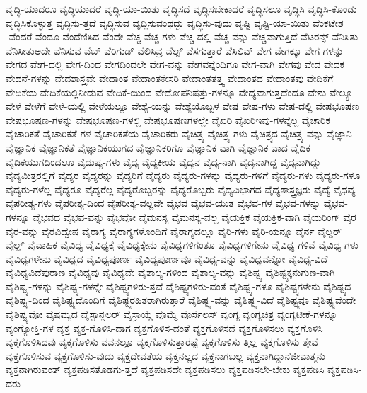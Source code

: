 {ವೃದ್ಧಿ-ಯಾದರೂ
ವೃದ್ಧಿಯಾದರೆ
ವೃದ್ಧಿ-ಯಾ-ಯಿತು
ವೃದ್ಧಿಸದೆ
ವೃದ್ಧಿಸಬೇಕಾದರೆ
ವೃದ್ಧಿಸಲೂ
ವೃದ್ಧಿಸಿ
ವೃದ್ಧಿಸಿ-ಕೊಂಡು
ವೃದ್ಧಿಸಿಕೊಳ್ಳುತ್ತ
ವೃದ್ಧಿಸು-ತ್ತದೆ
ವೃದ್ಧಿಸುವ
ವೃದ್ಧಿಸುವಂಥದ್ದು
ವೃದ್ಧಿಸು-ವುದು
ವೃಷ್ಟಿ
ವೃಷ್ಟಿ-ಯಾ-ಯಿತು
ವೆಂಕಟೇಶ
-ವೆಂದರೆ
ವೆಂದೂ
ವೆಂದೆಣಿಸಿದ
ವೆಂದೇ
ವೆಚ್ಚ
ವೆಚ್ಚ-ಗಳು
ವೆಚ್ಚ-ದಲ್ಲಿ
ವೆಚ್ಚ-ವನ್ನು
ವೆಚ್ಚವಾಗುತ್ತಿದೆ
ವೆಟರನ್ಸ್
ವೆನಿಸಿತು
ವೆನಿಸೀತುಅದೇ
ವೆನಿಸುವ
ವೆಬ್
ವೆರಿಗುಡ್
ವೆಲಿಸಿವ್ರ
ವೆಲ್ಸ್
ವೆಸಗುತ್ತಾರೆ
ವೆಸಿಲಿವ್
ವೇಗ
ವೇಗಕ್ಕೂ
ವೇಗ-ಗಳನ್ನು
ವೇಗದ
ವೇಗ-ದಲ್ಲಿ
ವೇಗ-ದಿಂದ
ವೇಗದಿಂದಲೇ
ವೇಗ-ವನ್ನು
ವೇಗವನ್ನೆಂದಿಗೂ
ವೇಗ-ವಾಗಿ
ವೇಗವು
ವೇದ
ವೇದಕ
ವೇದನೆ-ಗಳನ್ನು
ವೇದಶಾಸ್ತ್ರವೇ
ವೇದಾಂತ
ವೇದಾಂತಕೇಸರಿ
ವೇದಾಂತತತ್ತ್ವ
ವೇದಾಂತದ
ವೇದಾಂತವು
ವೇದಿಕೆಗೆ
ವೇದಿಕೆಯ
ವೇದಿಕೆಯಲ್ಲಿನೀಡುವ
ವೇದಿಕೆ-ಯಿಂದ
ವೇದೋಪನಿಷತ್ತು-ಗಳನ್ನೂ
ವೇದ್ಯವಾಗುತ್ತದೆಂದೂ
ವೇನು
ವೇಲ್ಯೂ
ವೇಳೆ
ವೇಳೆಗೆ
ವೇಳೆ-ಯಲ್ಲಿ
ವೇಳೆಯಲ್ಲೂ
ವೇಶ್ಯೆ-ಯನ್ನು
ವೇಶ್ಯೆಯೊಬ್ಬಳ
ವೇಷ
ವೇಷ-ಗಳು
ವೇಷ-ದಲ್ಲಿ
ವೇಷಭೂಷಣ
ವೇಷಭೂಷಣ-ಗಳನ್ನು
ವೇಷಭೂಷಣ-ಗಳಲ್ಲಿ
ವೇಷಭೂಷಣಗಳಲ್ಲೇ
ವೈಖರಿ
ವೈಖರಿಇವು-ಗಳನ್ನೆಲ್ಲ
ವೈಚಾರಿಕ
ವೈಚಾರಿಕತೆ
ವೈಚಾರಿಕತೆ-ಗಳ
ವೈಚಾರಿಕತೆಯ
ವೈಚಾರಿಕರು
ವೈಚಿತ್ರ್ಯ
ವೈಚಿತ್ರ್ಯ-ಗಳು
ವೈಚಿತ್ರ್ಯದ
ವೈಚಿತ್ರ್ಯ-ವನ್ನು
ವೈಜ್ಞಾನಿ
ವೈಜ್ಞಾನಿಕ
ವೈಜ್ಞಾನಿಕತೆ
ವೈಜ್ಞಾನಿಕಯುಗದ
ವೈಜ್ಞಾನಿಕರಿಗೂ
ವೈಜ್ಞಾನಿಕ-ವಾಗಿ
ವೈಜ್ಞಾನಿಕ-ವಾದ
ವೈದಿಕ
ವೈದಿಕಯುಗದಿಂದಲೂ
ವೈದುಷ್ಯ-ಗಳು
ವೈದ್ಯ
ವೈದ್ಯಕೀಯ
ವೈದ್ಯನ
ವೈದ್ಯ-ನಾಗಿ
ವೈದ್ಯನಾಗಿದ್ದ
ವೈದ್ಯನಾಗಿದ್ದು
ವೈದ್ಯಮಿತ್ರರಲ್ಲಿಗೆ
ವೈದ್ಯರ
ವೈದ್ಯರನ್ನು
ವೈದ್ಯರಿಗೆ
ವೈದ್ಯರು
ವೈದ್ಯರು-ಗಳನ್ನು
ವೈದ್ಯರು-ಗಳಿಗೆ
ವೈದ್ಯರು-ಗಳು
ವೈದ್ಯರು-ಗಳೂ
ವೈದ್ಯರು-ಗಳೆಲ್ಲ
ವೈದ್ಯರೂ
ವೈದ್ಯರೆಲ್ಲ
ವೈದ್ಯರೊಬ್ಬರನ್ನು
ವೈದ್ಯರೊಬ್ಬರು
ವೈದ್ಯವಿಭಾಗದ
ವೈದ್ಯಶಾಸ್ತ್ರಜ್ಞರು
ವೈದ್ಯೆ
ವೈಧವ್ಯ
ವೈಪರೀತ್ಯ-ಗಳು
ವೈಪರೀತ್ಯ-ದಿಂದ
ವೈಪರೀತ್ಯ-ವಲ್ಲವೇ
ವೈಭವ
ವೈಭವ-ಯುತ
ವೈಭವ-ಗಳ
ವೈಭವ-ಗಳನ್ನು
ವೈಭವ-ಗಳನ್ನೂ
ವೈಭವದ
ವೈಭವ-ವನ್ನು
ವೈಭವೋ
ವೈಮನಸ್ಯ
ವೈಮನಸ್ಯ-ವಲ್ಲ
ವೈಯಕ್ತಿಕ
ವೈಯಕ್ತಿಕ-ವಾಗಿ
ವೈಯರಿಂಗ್
ವೈರ
ವೈರ-ವನ್ನು
ವೈರವಿದ್ವೇಷ
ವೈರಾಗ್ಯ
ವೈರಾಗ್ಯಗಳೊಂದಿಗೆ
ವೈರಾಗ್ಯದಲ್ಲೂ
ವೈರಿ-ಗಳು
ವೈರಿ-ಯನ್ನೂ
ವೈರ್ನ
ವೈಲ್ಡರ್
ವೈಲ್ಡ್
ವೈವಾಹಿಕ
ವೈವಿಧ್ಯ
ವೈವಿಧ್ಯಕ್ಕೆ
ವೈವಿಧ್ಯಕ್ಕೇನು
ವೈವಿಧ್ಯಗಳಿಗಂತೂ
ವೈವಿಧ್ಯಗಳಿಗೇನು
ವೈವಿಧ್ಯ-ಗಳಿವೆ
ವೈವಿಧ್ಯ-ಗಳು
ವೈವಿಧ್ಯಗಳೇನು
ವೈವಿಧ್ಯದ
ವೈವಿಧ್ಯಪೂರ್ಣ
ವೈವಿಧ್ಯಪೂರ್ಣವೂ
ವೈವಿಧ್ಯ-ವನ್ನು
ವೈವಿಧ್ಯವನ್ನೋ
ವೈವಿಧ್ಯ-ವಿದೆ
ವೈವಿಧ್ಯವಿದೆಪುರಾಣ
ವೈವಿಧ್ಯವು
ವೈವಿಧ್ಯವೇ
ವೈಶಾಲ್ಯ-ಗಳಿಂದ
ವೈಶಾಲ್ಯ-ವನ್ನು
ವೈಶಿಷ್ಟ್ಯ
ವೈಶಿಷ್ಟ್ಯಕ್ಕನುಗುಣ-ವಾಗಿ
ವೈಶಿಷ್ಟ್ಯ-ಗಳನ್ನು
ವೈಶಿಷ್ಟ್ಯ-ಗಳನ್ನೇ
ವೈಶಿಷ್ಟ್ಯಗಳಿರು-ತ್ತವೆ
ವೈಶಿಷ್ಟ್ಯಗಳಿರು-ವಂತೆ
ವೈಶಿಷ್ಟ್ಯ-ಗಳೂ
ವೈಶಿಷ್ಟ್ಯಗಳೇನು
ವೈಶಿಷ್ಟ್ಯದ
ವೈಶಿಷ್ಟ್ಯ-ದಿಂದ
ವೈಶಿಷ್ಟ್ಯದೊಂದಿಗೆ
ವೈಶಿಷ್ಟ್ಯರಹಿತರಾಗಿರುತ್ತಾರೆ
ವೈಶಿಷ್ಟ್ಯ-ವನ್ನು
ವೈಶಿಷ್ಟ್ಯ-ವಿದೆ
ವೈಶಿಷ್ಟ್ಯವೂ
ವೈಶಿಷ್ಟ್ಯವೆಂದೇ
ವೈಶಿಷ್ಟ್ಯವೋ
ವೈಷಮ್ಯದ
ವೈಸ್ಛಾನ್ಸಲರ್
ವೈಸ್ರಾಯ್ಗೆ
ವೊಮ್ಮೆ
ವೊರ್ಸೆಲಸ್
ವ್ಯಂಗ್ಯ
ವ್ಯಂಗ್ಯಚಿತ್ರ
ವ್ಯಂಗ್ಯಟೀಕೆ-ಗಳನ್ನೂ
ವ್ಯಂಗ್ಯೋಕ್ತಿ-ಗಳ
ವ್ಯಕ್ತ
ವ್ಯಕ್ತ-ಗೊಳಿಸಿ-ದಾಗ
ವ್ಯಕ್ತಗೊಳಿಸ-ದಂತೆ
ವ್ಯಕ್ತಗೊಳಿಸದೆ
ವ್ಯಕ್ತಗೊಳಿಸಲು
ವ್ಯಕ್ತಗೊಳಿಸಿ
ವ್ಯಕ್ತಗೊಳಿಸಿದವು
ವ್ಯಕ್ತಗೊಳಿಸು-ವವನಲ್ಲೂ
ವ್ಯಕ್ತಗೊಳಿಸುತ್ತಾರಷ್ಟೆ
ವ್ಯಕ್ತಗೊಳಿಸು-ತ್ತಿಲ್ಲ
ವ್ಯಕ್ತಗೊಳಿಸು-ತ್ತೇವೆ
ವ್ಯಕ್ತಗೊಳಿಸುವ
ವ್ಯಕ್ತಗೊಳಿಸು-ವುದು
ವ್ಯಕ್ತದೇವತೆಯ
ವ್ಯಕ್ತನಲ್ಲದ
ವ್ಯಕ್ತನಾಗಬಲ್ಲ
ವ್ಯಕ್ತನಾಗಿದ್ದಾನೆಜೀವಾತ್ಮನು
ವ್ಯಕ್ತನಾಗಿರುವಂತ್
ವ್ಯಕ್ತಪಡಿಸತೊಡಗು-ತ್ತದೆ
ವ್ಯಕ್ತಪಡಿಸದೇ
ವ್ಯಕ್ತಪಡಿಸಲು
ವ್ಯಕ್ತಪಡಿಸಲೇ-ಬೇಕು
ವ್ಯಕ್ತಪಡಿಸಿ
ವ್ಯಕ್ತಪಡಿಸಿ-ದರು
}
